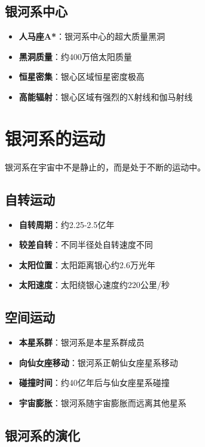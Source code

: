 \documentclass[12pt,UTF8]{ctexbook}
\begin{document}
\subsection{银河系中心}

\begin{itemize}
  \item \textbf{人马座A*}：银河系中心的超大质量黑洞
  \item \textbf{黑洞质量}：约400万倍太阳质量
  \item \textbf{恒星密集}：银心区域恒星密度极高
  \item \textbf{高能辐射}：银心区域有强烈的X射线和伽马射线
\end{itemize}

\section{银河系的运动}

银河系在宇宙中不是静止的，而是处于不断的运动中。

\subsection{自转运动}

\begin{itemize}
  \item \textbf{自转周期}：约2.25-2.5亿年
  \item \textbf{较差自转}：不同半径处自转速度不同
  \item \textbf{太阳位置}：太阳距离银心约2.6万光年
  \item \textbf{太阳速度}：太阳绕银心速度约220公里/秒
\end{itemize}

\subsection{空间运动}

\begin{itemize}
  \item \textbf{本星系群}：银河系是本星系群成员
  \item \textbf{向仙女座移动}：银河系正朝仙女座星系移动
  \item \textbf{碰撞时间}：约40亿年后与仙女座星系碰撞
  \item \textbf{宇宙膨胀}：银河系随宇宙膨胀而远离其他星系
\end{itemize}

\subsection{银河系的演化}
\end{document}
